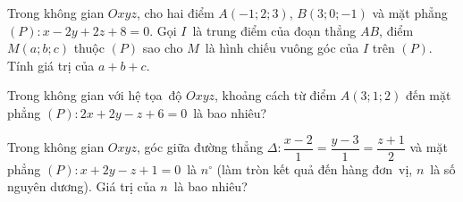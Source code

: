 \begin{bt}%
	Trong không gian $Oxyz$, cho hai điểm $A(-1;2;3)$, $B(3;0;-1)$ và mặt phẳng $(P) \colon x-2y+2z+8=0$. Gọi $I$~là trung điểm của đoạn thẳng $AB$, điểm $M(a;b;c)$ thuộc $(P)$ sao cho $M$~là hình chiếu vuông góc của $I$ trên $(P)$. Tính giá trị của $a+b+c$. 
\end{bt}

\begin{bt}%
	Trong không gian với  hệ tọa~độ $Oxyz$, khoảng cách từ điểm $A(3; 1; 2)$ đến mặt phẳng $(P)\colon 2 x+2 y-z+6=0$~là bao nhiêu?
\end{bt}

\begin{bt}%
	Trong không gian $Oxyz$, góc giữa đường thẳng $\Delta\colon \dfrac{x-2}{1}=\dfrac{y-3}{1}=\dfrac{z+1}{2}$ và mặt phẳng $(P)\colon  x+2y-z+1=0$~là $n^\circ$ (làm tròn kết quả đến hàng đơn~vị, $n$~là số nguyên dương). Giá trị của $n$~là bao nhiêu?
\end{bt}

